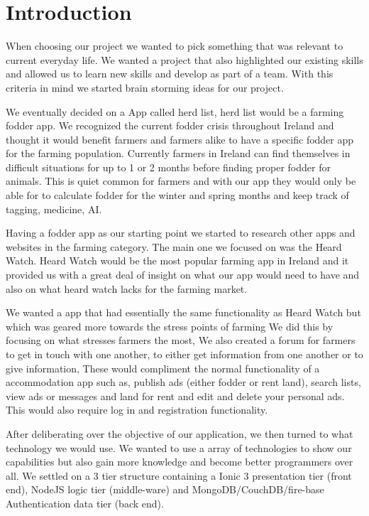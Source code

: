 \documentclass[12pt,a4paper,oneside,openany]{book}
\begin{document}
\chapter{Introduction}
When choosing our project we wanted to pick something that was relevant to current everyday life. We wanted a project that also highlighted our existing skills and allowed us to learn new skills and develop as part of a team. With this criteria in mind we started brain storming ideas for our project.  

We eventually decided on a App called herd list, herd list would be a farming fodder app. We recognized the current fodder crisis throughout Ireland and thought it would benefit farmers and farmers alike to have a specific fodder app for the farming population.
Currently farmers in Ireland can find themselves in difficult situations for up to 1 or 2 months before finding proper fodder for animals.
This is quiet common for farmers and with our app they would only be able for to calculate fodder for the winter and spring months and keep track of tagging, medicine, AI.

Having a fodder app as our starting point we started to research other apps and websites in the farming category. The main one we focused on was the Heard Watch. Heard Watch would be the most popular farming app in Ireland and it provided us with a great deal of insight on what our app would need to have and also on what heard watch lacks for the farming market.

We wanted a app that had essentially the same functionality as Heard Watch but which was geared more towards the stress points of farming We did this by focusing on what stresses farmers the most, We also created a forum for farmers to get in touch with one another, to either get information from one another or to give information, These would compliment the normal functionality of a accommodation app such as, publish ads (either fodder or rent land), search lists, view ads or messages and land for rent and edit and delete your personal ads. This would also require log in and registration functionality.  

After deliberating over the objective of our application, we then turned to what technology we would use. We wanted to use a array of technologies to show our capabilities but also gain more knowledge and become better programmers over all. We settled on a 3 tier structure containing a Ionic 3 presentation tier (front end), NodeJS logic tier (middle-ware)  and MongoDB/CouchDB/fire-base Authentication data tier (back end).
\end{document}
